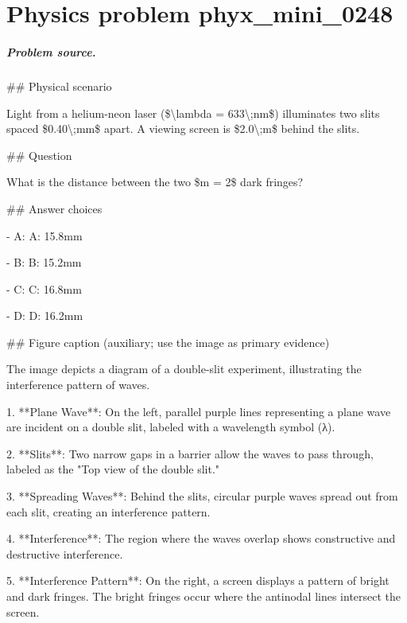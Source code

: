 
\chapter{Physics problem phyx\_mini\_0248}
\label{ch:PhyXMiniProblems_problem_phyx_mini_0248}

\paragraph{Problem source.}
\#\# Physical scenario

Light from a helium-neon laser (\$\textbackslash{}lambda = 633\textbackslash{};nm\$) illuminates two slits spaced \$0.40\textbackslash{};mm\$ apart. A viewing screen is \$2.0\textbackslash{};m\$ behind the slits.

\#\# Question

What is the distance between the two \$m = 2\$ dark fringes?

\#\# Answer choices

- A: A: 15.8mm

- B: B: 15.2mm

- C: C: 16.8mm

- D: D: 16.2mm

\#\# Figure caption (auxiliary; use the image as primary evidence)

The image depicts a diagram of a double-slit experiment, illustrating the interference pattern of waves.

1. **Plane Wave**: On the left, parallel purple lines representing a plane wave are incident on a double slit, labeled with a wavelength symbol (λ).

2. **Slits**: Two narrow gaps in a barrier allow the waves to pass through, labeled as the "Top view of the double slit."

3. **Spreading Waves**: Behind the slits, circular purple waves spread out from each slit, creating an interference pattern.

4. **Interference**: The region where the waves overlap shows constructive and destructive interference.

5. **Interference Pattern**: On the right, a screen displays a pattern of bright and dark fringes. The bright fringes occur where the antinodal lines intersect the screen.

